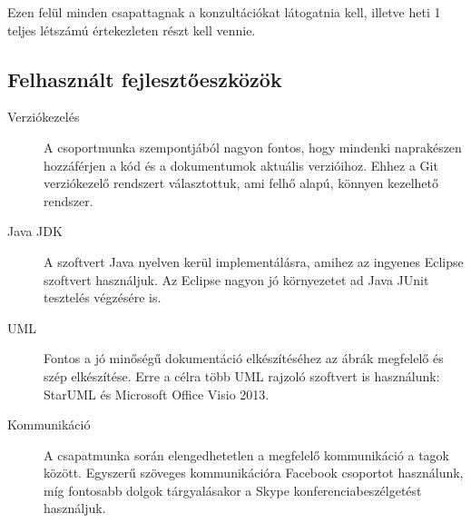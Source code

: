 Ezen felül minden csapattagnak a konzultációkat látogatnia kell, illetve heti 1 teljes létszámú értekezleten részt kell vennie.
\subsection{Felhasznált fejlesztőeszközök}
\begin{description}
\item[Verziókezelés] A csoportmunka szempontjából nagyon fontos, hogy mindenki naprakészen hozzáférjen a kód és a dokumentumok aktuális verzióihoz. Ehhez a Git verziókezelő rendszert választottuk, ami felhő alapú, könnyen kezelhető rendszer.

\item[Java JDK] A szoftvert Java nyelven kerül implementálásra, amihez az ingyenes Eclipse szoftvert használjuk. Az Eclipse nagyon jó környezetet ad Java JUnit tesztelés végzésére is.

\item[UML] Fontos a jó minőségű dokumentáció elkészítéséhez az ábrák megfelelő és szép elkészítése. Erre a célra több UML rajzoló szoftvert is használunk: StarUML és Microsoft Office Visio 2013.

\item[Kommunikáció] A csapatmunka során elengedhetetlen a megfelelő kommunikáció a tagok között. Egyszerű szöveges kommunikációra Facebook csoportot használunk, míg fontosabb dolgok tárgyalásakor a Skype konferenciabeszélgetést használjuk.
\end{description}


